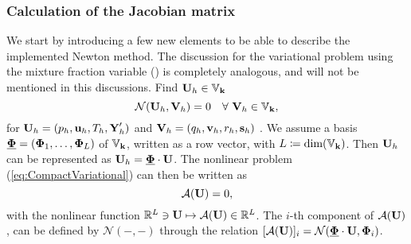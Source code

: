 \subsubsection{Calculation of the Jacobian matrix} 
We start by introducing a few new elements to be able to describe the implemented Newton method. 
The discussion for the variational problem using the mixture fraction variable () is completely analogous, and will not be mentioned in this discussions. 
Find $\textbf{U}_h \in \mathbb{V}_{\textbf{k}}$
\begin{equation}
\mathcal{N}(\textbf{U}_h,\textbf{V}_h) = 0 \quad \forall \ \textbf{V}_h \in \mathbb{V}_{\textbf{k}} ,
\label{eq:CompactVariational}
\end{equation} 
for 
$\textbf{U}_h = (p_h,\textbf{u}_h, T_h, \textbf{Y}'_h)$ and 
$\textbf{V}_h = (q_h,\textbf{v}_h, r_h, \mathbf{s}_h)$
. We assume a basis 
$\underline{\boldsymbol{\Phi}} = ( \boldsymbol{\Phi}_1, \ldots , \boldsymbol{\Phi}_L )$ of $\mathbb{V}_{\textbf{k}}$,
written as a row vector, with $L \coloneqq \textrm{dim}(\mathbb{V}_{\textbf{k}})$.
Then $\textbf{U}_h$ can be represented as 
$ \textbf{U}_h =  \underline{ \boldsymbol{\Phi} } \cdot \textbf{U} $.
The nonlinear problem (\ref{eq:CompactVariational}) can then be written as
\begin{equation}
\mathcal{A}(\textbf{U}) = 0 ,
\label{Eq:nonLinSystem}
\end{equation}
with the nonlinear function 
$\mathbb{R}^L \ni \textbf{U} \mapsto \mathcal{A}(\textbf{U}) \in \mathbb{R}^L$.
The $i$-th component of $ \mathcal{A}(\textbf{U})$, can be defined by $\mathcal{N}(-,-)$ through the relation
$[\mathcal{A}(\textbf{U})]_i = \mathcal{N}( \underline{ \boldsymbol{\Phi} } \cdot \textbf{U} , \boldsymbol{\Phi}_i)$.

